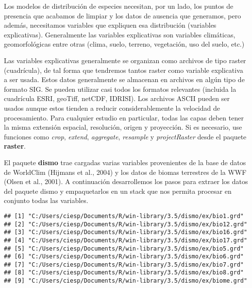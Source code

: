 \documentclass[]{article}
\newenvironment{Shaded}{\begin{snugshade}}{\end{snugshade}}
\newcommand{\KeywordTok}[1]{\textcolor[rgb]{0.13,0.29,0.53}{\textbf{{#1}}}}
\newcommand{\DataTypeTok}[1]{\textcolor[rgb]{0.13,0.29,0.53}{{#1}}}
\newcommand{\StringTok}[1]{\textcolor[rgb]{0.31,0.60,0.02}{{#1}}}
\newcommand{\CommentTok}[1]{\textcolor[rgb]{0.56,0.35,0.01}{\textit{{#1}}}}
\newcommand{\OtherTok}[1]{\textcolor[rgb]{0.56,0.35,0.01}{{#1}}}
\newcommand{\NormalTok}[1]{{#1}}
\begin{document}
Los modelos de distribución de especies necesitan, por un lado, los
puntos de presencia que acabamos de limpiar y los datos de ausencia que
generamos, pero además, necesitamos variables que expliquen esa
distribución (variables explicativas). Generalmente las variables
explicativas son variables climáticas, geomorfológicas entre otras
(clima, suelo, terreno, vegetación, uso del suelo, etc.)

Las variables explicativas generalmente se organizan como archivos de
tipo raster (cuadrícula), de tal forma que tendremos tantos raster como
variable explicativa a ser usada. Estos datos generalmente se almacenan
en archivos en algún tipo de formato SIG. Se pueden utilizar casi todos
los formatos relevantes (incluida la cuadrícula ESRI, geoTiff, netCDF,
IDRISI). Los archivos ASCII pueden ser usados aunque estos tienden a
reducir considerablemente la velocidad de procesamiento. Para cualquier
estudio en particular, todas las capas deben tener la misma extensión
espacial, resolución, origen y proyección. Si es necesario, use
funciones como \emph{crop}, \emph{extend}, \emph{aggregate},
\emph{resample} y \emph{projectRaster} desde el paquete \textbf{raster}.

El paquete \textbf{dismo} trae cargadas varias variables provenientes de
la base de datos de WorldClim (Hijmans et al., 2004) y los datos de
biomas terrestres de la WWF (Olsen et al., 2001). A continuación
desarrollemos los pasos para extraer los datos del paquete dismo y
empaquetarlos en un stack que nos permita procesar en conjunto todas las
variables.

\begin{Shaded}
\end{Shaded}

\begin{verbatim}
## [1] "C:/Users/ciesp/Documents/R/win-library/3.5/dismo/ex/bio1.grd" 
## [2] "C:/Users/ciesp/Documents/R/win-library/3.5/dismo/ex/bio12.grd"
## [3] "C:/Users/ciesp/Documents/R/win-library/3.5/dismo/ex/bio16.grd"
## [4] "C:/Users/ciesp/Documents/R/win-library/3.5/dismo/ex/bio17.grd"
## [5] "C:/Users/ciesp/Documents/R/win-library/3.5/dismo/ex/bio5.grd" 
## [6] "C:/Users/ciesp/Documents/R/win-library/3.5/dismo/ex/bio6.grd" 
## [7] "C:/Users/ciesp/Documents/R/win-library/3.5/dismo/ex/bio7.grd" 
## [8] "C:/Users/ciesp/Documents/R/win-library/3.5/dismo/ex/bio8.grd" 
## [9] "C:/Users/ciesp/Documents/R/win-library/3.5/dismo/ex/biome.grd"
\end{verbatim}
\end{document}
